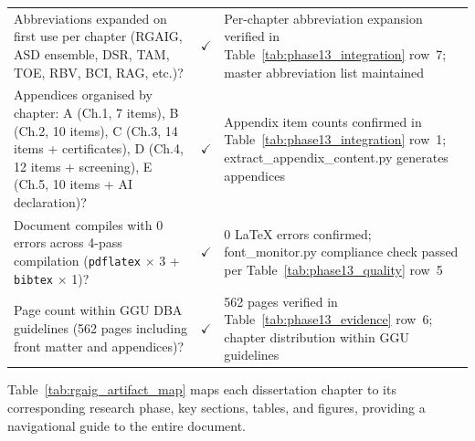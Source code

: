 \begin{xltabular}{\textwidth}{@{} X c X @{}}
\addlinespace
Abbreviations expanded on first use per chapter (RGAIG, ASD ensemble, DSR, TAM, TOE, RBV, BCI, RAG, etc.)?                                                   & $\checkmark$ & Per-chapter abbreviation expansion verified in Table~\ref{tab:phase13_integration} row~7; master abbreviation list maintained \\
\addlinespace
Appendices organised by chapter: A (Ch.1, 7 items), B (Ch.2, 10 items), C (Ch.3, 14 items + certificates), D (Ch.4, 12 items + screening), E (Ch.5, 10 items + AI declaration)? & $\checkmark$ & Appendix item counts confirmed in Table~\ref{tab:phase13_integration} row~1; extract\_appendix\_content.py generates appendices \\
\addlinespace
Document compiles with 0 errors across 4-pass compilation (\texttt{pdflatex} $\times$ 3 + \texttt{bibtex} $\times$ 1)?                               & $\checkmark$ & 0 \LaTeX{} errors confirmed; font\_monitor.py compliance check passed per Table~\ref{tab:phase13_quality} row~5 \\
\addlinespace
Page count within GGU DBA guidelines (562 pages including front matter and appendices)?                                                                & $\checkmark$ & 562 pages verified in Table~\ref{tab:phase13_evidence} row~6; chapter distribution within GGU guidelines \\
\end{xltabular}
\endgroup

\vspace{1.5em}


Table~\ref{tab:rgaig_artifact_map} maps each dissertation chapter to its corresponding research phase, key sections, tables, and figures, providing a navigational guide to the entire document.

